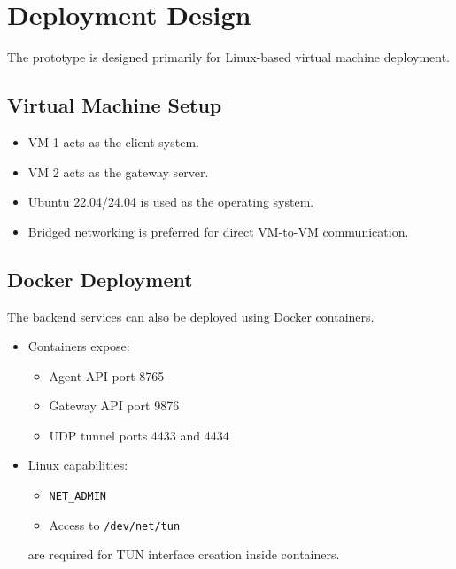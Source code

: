 \section{Deployment Design}

The prototype is designed primarily for Linux-based virtual machine deployment.

\subsection{Virtual Machine Setup}

\begin{itemize}
    \item VM 1 acts as the client system.
    \item VM 2 acts as the gateway server.
    \item Ubuntu 22.04/24.04 is used as the operating system.
    \item Bridged networking is preferred for direct VM-to-VM communication.
\end{itemize}

\subsection{Docker Deployment}

The backend services can also be deployed using Docker containers.

\begin{itemize}
    \item Containers expose:
    \begin{itemize}
        \item Agent API port 8765
        \item Gateway API port 9876
        \item UDP tunnel ports 4433 and 4434
    \end{itemize}

    \item Linux capabilities:
    \begin{itemize}
        \item \texttt{NET\_ADMIN}
        \item Access to \texttt{/dev/net/tun}
    \end{itemize}
    are required for TUN interface creation inside containers.
\end{itemize}